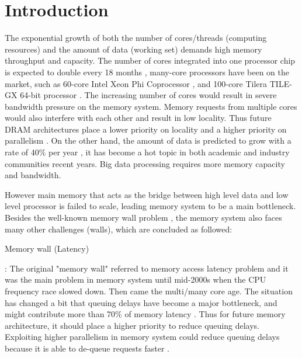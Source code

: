 \documentclass[pageno]{jpaper}
\begin{document}
\section{Introduction}
The exponential growth of both the number of cores/threads (computing resources) and the amount of data (working set) demands high memory throughput and capacity. The number of cores integrated into one processor chip is expected to double every 18 months \cite{ITRSRoadmap}, many-core processors have been on the market, such as 60-core Intel Xeon Phi Coprocessor \cite{XeonPhi}, and  100-core Tilera TILE-GX 64-bit processor \cite{TileraGX}. The increasing number of cores would result in severe bandwidth pressure on the memory system. Memory requests from multiple cores would also interfere with each other and result in low locality. Thus future DRAM architectures place a lower priority on locality and a higher priority on parallelism \cite{RethinkDRAMArch}. On the other hand, the amount of data is predicted to grow with a rate of 40\% per year \cite{BigData}, it has become a hot topic in both academic and industry communities recent years. Big data processing requires more memory capacity and bandwidth.

However main memory that acts as the bridge between high level data and low level processor is failed to scale, leading memory system to be a main bottleneck. Besides the well-known memory wall problem \cite{MemoryWall}, the memory system also faces many other challenges (walls), which are concluded as followed:

\begin{bfseries}Memory wall (Latency)\end{bfseries}: The original "memory wall" referred to memory access latency problem \cite{MemoryWall} and it was the main problem in memory system until mid-2000s when the CPU frequency race slowed down. Then came the multi/many core age. The situation has changed a bit that queuing delays have become a major bottleneck, and might contribute more than 70\% of memory latency \cite{RethinkDRAMArch}. Thus for future memory architecture, it should place a higher priority to reduce queuing delays. Exploiting higher parallelism in memory system could reduce queuing delays because it is able to de-queue requests faster \cite{RethinkDRAMArch}.
\end{document}
